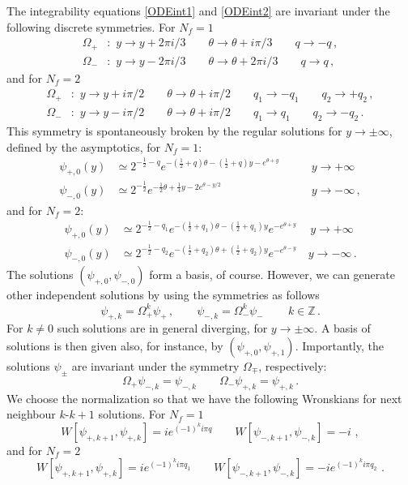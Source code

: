 \documentclass[11pt,a4paper]{elsarticle}
\def \th {\theta}
\def \ba {\begin{aligned}}
\def \ea {\end{aligned}}
\newcommand{\be}{\begin{equation}}
\newcommand{\ee}{\end{equation}}
\def\th{\theta}
\numberwithin{figure}{section}
\numberwithin{table}{section}
\begin{document}
The integrability equations \eqref{ODEint1} and \eqref{ODEint2} are invariant under the following discrete symmetries. For $N_f=1$
\be  \label{OmegaSym1}
\ba 
\Omega_+ &: \,\,y \to y +2\pi i/3 \qquad \theta \to \theta+i \pi/3\qquad q \to - q\,, \\
\Omega_-  &: \,\,y \to y -2\pi i/3 \qquad \theta \to \theta+2\pi i /3\qquad q \to  q \,,
\ea 
\ee 
and for $N_f=2$
\be \label{OmegaSym2}
\ba 
\Omega_{+} &: \,\, y \to y+ i \pi/2\qquad \th \to \th+i \pi/2 \qquad q_1 \to - q_1\qquad q_2 \to + q_2\,,  \\
\Omega_{-} &: \,\, y \to y- i \pi /2\qquad \th \to \th+i \pi/2\qquad q_1 \to q_1 \qquad q_2 \to - q_2\,.\
\ea 
\ee 
This symmetry is spontaneously broken by the regular solutions for $y \to \pm \infty$, defined by the asymptotics, for $N_f=1$:
\be 
\ba\label{asyreg1}
\psi_{+,0}(y)&\simeq 2^{-\frac{1}{2}-q} e^{-(\frac{1}{2}+q)\th-\left(\frac{1}{2}+q\right)y-e^{\th+y}} \qquad &y \to + \infty  \\
\psi_{-,0}(y) &\simeq 2^{-\frac{1}{2}} e^{-\frac{1}{2}\theta +\frac{1}{4} y -2e^{\th -y/2} }\qquad &y \to - \infty \,,
\ea
\ee 
and for $N_f=2$:
\be  \label{asyreg2} 
\ba 
\psi_{+,0}(y) &\simeq 2^{-\frac{1}{2}-q_1 }e^{-(\frac{1}{2}+q_1)\th-(\frac{1}{2}+q_1)y}e^{-e^{\th+y}}\, \quad y\to + \infty \,\\
\psi_{-,0}(y) &\simeq 2^{-\frac{1}{2}-q_2}e^{-(\frac{1}{2}+q_2)\th+(\frac{1}{2}+q_2)y}e^{- e^{\th- y}}\quad y\to - \infty\,.
\ea 
\ee 
The solutions $(\psi_{+,0},\psi_{-,0})$ form a basis, of course. However, we can generate other independent solutions by using the symmetries as follows
\be
\psi_{+,k}=\Omega_{+}^{k}\psi_{+} \,, \qquad  \psi_{-,k}=\Omega_{-}^{k}\psi_{-}\, \qquad k \in \mathbb{Z}\,.
\ee
For $k \neq 0$ such solutions are in general diverging, for $y \to \pm \infty$. A basis of solutions is then given also, for instance, by $(\psi_{+,0},\psi_{+,1})$. Importantly, the solutions $\psi_\pm$ are invariant under the symmetry $\Omega_\mp$, respectively: 
\be 
\Omega_+\psi_{-,k}=\psi_{-,k} \qquad \Omega_-\psi_{+,k}=\psi_{+,k}\,.
\ee
We choose the normalization so that we have the following Wronskians for next neighbour $k$-$k+1$ solutions. For $N_f=1$
\be
W[\psi_{+,k+1},\psi_{+,k}]=i e^{(-1)^k i \pi q} \qquad  W[\psi_{-,k+1},\psi_{-,k}]=-i\,\,,
\ee
and for $N_f=2$
\be
W[\psi_{+,k+1},\psi_{+,k}]=i e^{(-1)^k i \pi q_1} \qquad  W[\psi_{-,k+1},\psi_{-,k}]=-i e^{(-1)^k i \pi q_2}\,\,.
\ee
\end{document}
